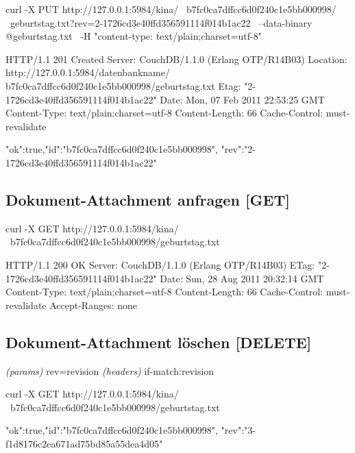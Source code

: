 \documentclass[19pt,landscape,twocolumn]{article}
\newcommand{\htmlverb}[1]{{[}\textbf{{#1}}{]}}
\newcommand{\setparskip}{\setlength{\parskip}{-6mm}}
\newcommand{\resetparskip}{\setlength{\parskip}{1mm}}
\begin{document}
\begin{code}
curl -X PUT http://127.0.0.1:5984/kina/ \
  b7fc0ca7dffcc6d0f240c1e5bb000998/ \
  geburtstag.txt?rev=2-1726cd3e40ffd356591114f014b1ac22 \
     --data-binary @geburtstag.txt \
     -H "content-type: text/plain;charset=utf-8"
\end{code}
\setparskip
\begin{response}
HTTP/1.1 201 Created
Server: CouchDB/1.1.0 (Erlang OTP/R14B03)
Location: http://127.0.0.1:5984/datenbankname/
  b7fc0ca7dffcc6d0f240c1e5bb000998/geburtstag.txt
Etag: "2-1726cd3e40ffd356591114f014b1ac22"
Date: Mon, 07 Feb 2011 22:53:25 GMT
Content-Type: text/plain;charset=utf-8
Content-Length: 66
Cache-Control: must-revalidate

{"ok":true,"id":"b7fc0ca7dffcc6d0f240c1e5bb000998",
 "rev":"2-1726cd3e40ffd356591114f014b1ac22"}
\end{response}
\resetparskip

\subsection{Dokument-Attachment anfragen \htmlverb{GET}}

\begin{code}
curl -X GET http://127.0.0.1:5984/kina/ \
  b7fc0ca7dffcc6d0f240c1e5bb000998/geburtstag.txt
\end{code}
\setparskip
\begin{response}
HTTP/1.1 200 OK
Server: CouchDB/1.1.0 (Erlang OTP/R14B03)
ETag: "2-1726cd3e40ffd356591114f014b1ac22"
Date: Sun, 28 Aug 2011 20:32:14 GMT
Content-Type: text/plain;charset=utf-8
Content-Length: 66
Cache-Control: must-revalidate
Accept-Ranges: none
\end{response}
\resetparskip

\subsection{Dokument-Attachment löschen \htmlverb{DELETE}}
\emph{(params)} rev=revision \newline
\emph{(headers)} if-match:revision

\begin{code}
curl -X GET http://127.0.0.1:5984/kina/ \
    b7fc0ca7dffcc6d0f240c1e5bb000998/geburtstag.txt
\end{code}
\setparskip
\begin{response}
{"ok":true,"id":"b7fc0ca7dffcc6d0f240c1e5bb000998",
 "rev":"3-f1d8176c2ea671ad75bd85a55dea4d05"}
\end{response}
\resetparskip
\end{document}
